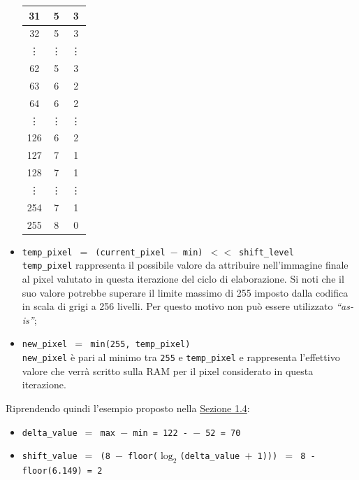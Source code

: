 \documentclass{article}
\begin{document}
\begin{itemize}
\begin{table}[h]
\begin{tabular}{||c|c|c||}
                    31      & 5         & 3         \\\hline
                    32      & 5         & 3         \\\hline
                    \vdots  & \vdots    & \vdots    \\\hline
                    62      & 5         & 3         \\\hline
                    63      & 6         & 2         \\\hline
                    64      & 6         & 2         \\\hline
                    \vdots  & \vdots    & \vdots    \\\hline
                    126     & 6         & 2         \\\hline
                    127     & 7         & 1         \\\hline
                    128     & 7         & 1         \\\hline
                    \vdots  & \vdots    & \vdots    \\\hline
                    254     & 7         & 1         \\\hline
                    255     & 8         & 0         \\\hline
                \end{tabular}
            \end{table}
            \vspace{0,3cm}

    \item   \texttt{temp\_pixel $=$ (current\_pixel $-$ min) $<<$ shift\_level}\\
            \texttt{temp\_pixel} rappresenta il possibile valore da attribuire nell’immagine finale al pixel valutato in questa iterazione del ciclo di elaborazione. Si noti che il suo valore potrebbe superare il limite massimo di 255 imposto dalla codifica in scala di grigi a 256 livelli. Per questo motivo non può essere utilizzato \emph{“as-is”};
    \item   \texttt{new\_pixel $=$ min(255, temp\_pixel)}\\
            \texttt{new\_pixel} è pari al minimo tra \texttt{255} e \texttt{temp\_pixel} e rappresenta l’effettivo valore che verrà scritto sulla RAM per il pixel considerato in questa iterazione.
\end{itemize}

Riprendendo quindi l'esempio proposto nella \hyperref[sec:esempio]{Sezione 1.4}:
\begin{itemize}
    \item   \texttt{delta\_value $=$ max $-$ min = 122 - $-$ 52 = 70}
    \item   \texttt{shift\_value $=$ (8 $-$ floor($\log_{2} $(delta\_value $+$ 1))) $=$ 8 - floor(6.149) = 2}
\end{itemize}
\end{document}
